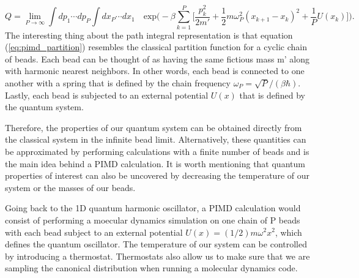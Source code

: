 \documentclass{article}
\newcommand{\be}{\begin{equation}}
\newcommand{\ee}{\end{equation}}
\begin{document}
\be \label{eq:pimd_partition}
  Q = \lim_{P \to\infty} \int dp_1 \cdots dp_P \int dx_P \cdots dx_1 \quad \text{exp}\Big( - \beta \sum_{k=1}^P \Big[ \frac{p^2_k}{2m'} + \frac{1}{2} m \omega^2_P (x_{k+1} - x_k)^2 + \frac{1}{P} U(x_k) \Big] \Big) .
\ee
The interesting thing about the path integral representation is that equation (\ref{eq:pimd_partition}) resembles the classical partition function for a cyclic chain of beads.
Each bead can be thought of as having the same fictious mass m' along with harmonic nearest neighbors.
In other words, each bead is connected to one another with a spring that is defined by the chain frequency $\omega_P = \sqrt{P}/(\beta \hbar)$.
Lastly, each bead is subjected to an external potential $U(x)$ that is defined by the quantum system.

Therefore, the properties of our quantum system can be obtained directly from the classical system in the infinite bead limit.
Alternatively, these quantities can be approximated by performing calculations with a finite number of beads and is the main idea behind a PIMD calculation.
It is worth mentioning that quantum properties of interest can also be uncovered by decreasing the temperature of our system or the masses of our beads.

Going back to the 1D quantum harmonic oscillator, a PIMD calculation would consist of performing a moecular dynamics simulation on one chain of P beads with each bead subject to an external potential $U(x) = (1/2)m \omega^2 x^2$, which defines the quantum oscillator.
The temperature of our system can be controlled by introducing a thermostat.
Thermostats also allow us to make sure that we are sampling the canonical distribution when running a molecular dynamics code.
\end{document}

